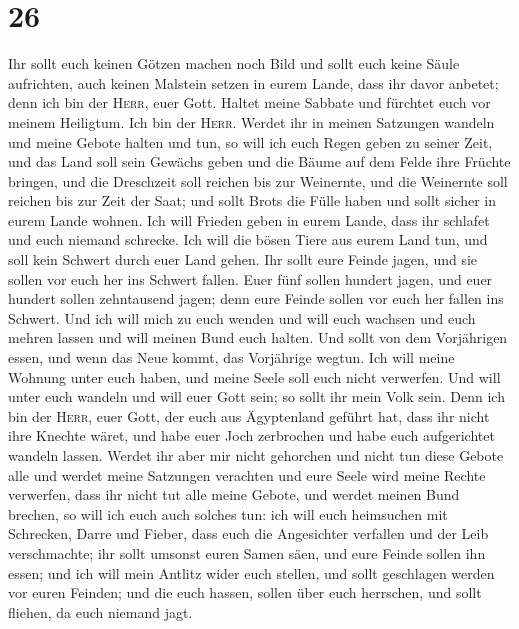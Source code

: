 \hypertarget{section-25}{%
\section{26}\label{section-25}}

 Ihr sollt euch keinen Götzen machen noch Bild und sollt
euch keine Säule aufrichten, auch keinen Malstein setzen in eurem Lande,
dass ihr davor anbetet; denn ich bin der \textsc{Herr}, euer Gott.
 Haltet meine Sabbate und fürchtet euch vor meinem
Heiligtum. Ich bin der \textsc{Herr}.  Werdet ihr in
meinen Satzungen wandeln und meine Gebote halten und tun, 
so will ich euch Regen geben zu seiner Zeit, und das Land soll sein
Gewächs geben und die Bäume auf dem Felde ihre Früchte bringen,
 und die Dreschzeit soll reichen bis zur Weinernte, und
die Weinernte soll reichen bis zur Zeit der Saat; und sollt Brots die
Fülle haben und sollt sicher in eurem Lande wohnen.  Ich
will Frieden geben in eurem Lande, dass ihr schlafet und euch niemand
schrecke. Ich will die bösen Tiere aus eurem Land tun, und soll kein
Schwert durch euer Land gehen.  Ihr sollt eure Feinde
jagen, und sie sollen vor euch her ins Schwert fallen. 
Euer fünf sollen hundert jagen, und euer hundert sollen zehntausend
jagen; denn eure Feinde sollen vor euch her fallen ins Schwert.
 Und ich will mich zu euch wenden und will euch wachsen
und euch mehren lassen und will meinen Bund euch halten. 
Und sollt von dem Vorjährigen essen, und wenn das Neue kommt, das
Vorjährige wegtun.  Ich will meine Wohnung unter euch
haben, und meine Seele soll euch nicht verwerfen.  Und
will unter euch wandeln und will euer Gott sein; so sollt ihr mein Volk
sein.  Denn ich bin der \textsc{Herr}, euer Gott, der
euch aus Ägyptenland geführt hat, dass ihr nicht ihre Knechte wäret, und
habe euer Joch zerbrochen und habe euch aufgerichtet wandeln lassen.
 Werdet ihr aber mir nicht gehorchen und nicht tun diese
Gebote alle  und werdet meine Satzungen verachten und
eure Seele wird meine Rechte verwerfen, dass ihr nicht tut alle meine
Gebote, und werdet meinen Bund brechen,  so will ich euch
auch solches tun: ich will euch heimsuchen mit Schrecken, Darre und
Fieber, dass euch die Angesichter verfallen und der Leib verschmachte;
ihr sollt umsonst euren Samen säen, und eure Feinde sollen ihn essen;
 und ich will mein Antlitz wider euch stellen, und sollt
geschlagen werden vor euren Feinden; und die euch hassen, sollen über
euch herrschen, und sollt fliehen, da euch niemand jagt.

